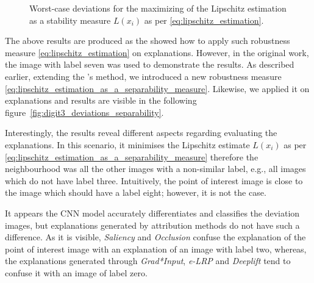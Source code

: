\documentclass[english]{tktltiki2}
\theoremstyle{definition}
\theoremstyle{remark}
\begin{document}
\begin{figure}[H]
	\vspace*{-5mm}
	\centering
	\qquad
	\qquad
	\qquad
	\qquad
	\caption{Worst-case deviations for the maximizing of the Lipschitz estimation as a stability measure $L(x_i)$ as per \eqref{eq:lipschitz_estimation}.}%
	\label{fig:digit3_deviations}%
\end{figure}

The above results are produced as the \citet{alvarez2018robustness} showed how to apply such robustness measure \eqref{eq:lipschitz_estimation} on explanations. However, in the original work, the image with label seven was used to demonstrate the results. As described earlier, extending the \citet{alvarez2018robustness}'s method, we introduced a new robustness measure \eqref{eq:lipschitz_estimation_as_a_separability_measure}. Likewise, we applied it on explanations and results are visible in the following figure~\ref{fig:digit3_deviations_separability}.

Interestingly, the results reveal different aspects regarding evaluating the explanations. In this scenario, it minimises the Lipschitz estimate $L(x_i)$ as per \eqref{eq:lipschitz_estimation_as_a_separability_measure} therefore the neighbourhood was all the other images with a non-similar label, e.g., all images which do not have label three. Intuitively, the point of interest image is close to the image which should have a label eight; however, it is not the case. 

It appears the CNN model accurately differentiates and classifies the deviation images, but explanations generated by attribution methods do not have such a difference. As it is visible, \textit{Saliency} and \textit{Occlusion} confuse the explanation of the point of interest image with an explanation of an image with label two, whereas, the explanations generated through \textit{Grad*Input}, \textit{e-LRP} and \textit{Deeplift} tend to confuse it with an image of label zero.
\end{document}
